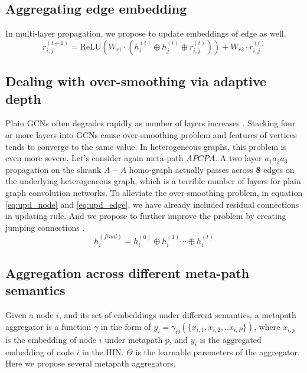 \subsection{Aggregating edge embedding}
 In multi-layer propagation, we propose to update embeddings of edge as well.
\begin{equation}
\label{eq:upd_edge}
r^{(t+1)}_{i,j} = \text{ReLU}(W_{r1}\cdot (h^{(t)}_i \oplus h^{(t)}_j \oplus r^{(t)}_{i,j})) + W_{r2}\cdot r^{(t)}_{i,j}
\end{equation} 

\subsection{Dealing with over-smoothing via adaptive depth}
Plain GCNs often degrades rapidly as number of layers increases \cite{LiHW18,abs-1904-03751}. Stacking four or more layers into GCNs cause over-smoothing problem and features of vertices tends to converge to the same value. In heterogeneous graphs, this problem is even more severe. Let's consider again meta-path $APCPA$. A two layer $a_1 a_2 a_3$ propagation on the shrank $A-A$ homo-graph actually passes across \textbf{8} edges on the underlying heterogeneous graph, which is a terrible number of layers for plain graph convolution networks.
To alleviate the over-smoothing problem, in equation \ref{eq:upd_node} and \ref{eq:upd_edge}, we have already included residual connections \cite{HeZRS16} in updating rule. And we propose to further improve the problem by creating jumping connections \cite{XuLTSKJ18}.
\begin{equation}
\label{eq:jump}
h^{(final)}_i = h^{(0)}_i \oplus h^{(1)}_i \cdots \oplus h^{(t)}_i
\end{equation} 

\subsection{Aggregation across different meta-path semantics}
Given a node $i$, and its set of embeddings under different semantics, a metapath aggregator is a function $\gamma$ in the form of $y_i = \gamma_\Theta(\{x_{i,1},x_{i,2},..x_{i,P}\})$, where $x_{i,p}$ is the embedding of node $i$ under metapath $p$, and $y_i$ is the aggregated embedding of node $i$ in the HIN. $\Theta$ is the learnable paremeters of the aggregator.
Here we propose several metapath aggregators. 

